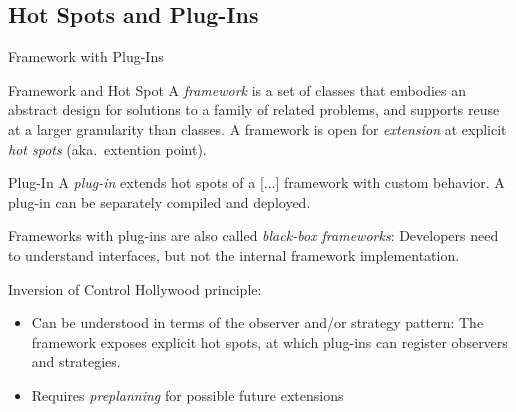 
\subsection{Hot Spots and Plug-Ins}
\begin{frame}{Framework with Plug-Ins}
	\begin{fancycolumns}[b]
		\begin{definition}{Framework and Hot Spot }
			A \emph{framework} is a set of classes that embodies an abstract design for solutions to a family of related problems, and supports reuse at a larger granularity than classes. A framework is open for \emph{extension} at explicit \emph{hot spots} (aka.\ extention point).
		\end{definition}
		\begin{definition}{Plug-In }
			A \emph{plug-in} extends hot spots of a [...] framework with custom behavior. A plug-in can be separately compiled and deployed.	
		\end{definition}
		\begin{note}{}
			Frameworks with plug-ins are also called \emph{black-box frameworks}: Developers need to understand interfaces, but not the internal framework implementation.
		\end{note}
	\nextcolumn
		\vspace{-12mm}
		\begin{note}{Inversion of Control}
			Hollywood principle: 

			\centering 
		\end{note}
		\begin{note}{}
			\begin{itemize}
				\item Can be understood in terms of the observer and/or strategy pattern: The framework exposes explicit hot spots, at which plug-ins can register observers and strategies.
				\item Requires \emph{preplanning} for possible future extensions
			\end{itemize}
		\end{note}
	\end{fancycolumns}
\end{frame}

